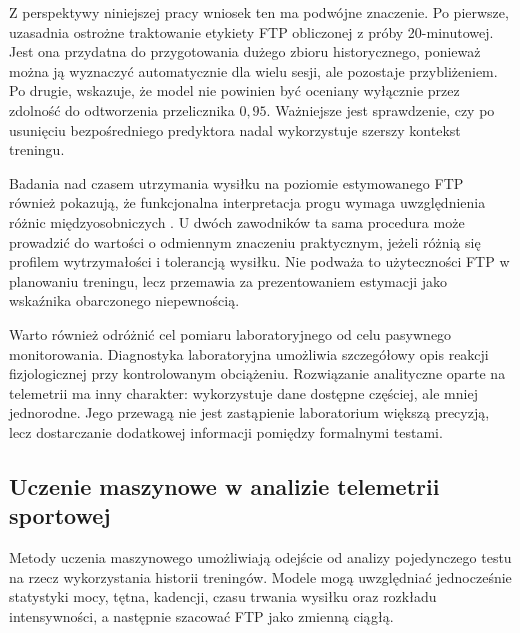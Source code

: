 Z perspektywy niniejszej pracy wniosek ten ma podwójne znaczenie. Po pierwsze, uzasadnia ostrożne traktowanie etykiety FTP obliczonej z próby 20-minutowej. Jest ona przydatna do przygotowania dużego zbioru historycznego, ponieważ można ją wyznaczyć automatycznie dla wielu sesji, ale pozostaje przybliżeniem. Po drugie, wskazuje, że model nie powinien być oceniany wyłącznie przez zdolność do odtworzenia przelicznika $0{,}95$. Ważniejsze jest sprawdzenie, czy po usunięciu bezpośredniego predyktora nadal wykorzystuje szerszy kontekst treningu.

Badania nad czasem utrzymania wysiłku na poziomie estymowanego FTP również pokazują, że funkcjonalna interpretacja progu wymaga uwzględnienia różnic międzyosobniczych \parencite{sitko2022tte}. U dwóch zawodników ta sama procedura może prowadzić do wartości o odmiennym znaczeniu praktycznym, jeżeli różnią się profilem wytrzymałości i tolerancją wysiłku. Nie podważa to użyteczności FTP w planowaniu treningu, lecz przemawia za prezentowaniem estymacji jako wskaźnika obarczonego niepewnością.

Warto również odróżnić cel pomiaru laboratoryjnego od celu pasywnego monitorowania. Diagnostyka laboratoryjna umożliwia szczegółowy opis reakcji fizjologicznej przy kontrolowanym obciążeniu. Rozwiązanie analityczne oparte na telemetrii ma inny charakter: wykorzystuje dane dostępne częściej, ale mniej jednorodne. Jego przewagą nie jest zastąpienie laboratorium większą precyzją, lecz dostarczanie dodatkowej informacji pomiędzy formalnymi testami.

\subsection{Uczenie maszynowe w analizie telemetrii sportowej}

Metody uczenia maszynowego umożliwiają odejście od analizy pojedynczego testu na rzecz wykorzystania historii treningów. Modele mogą uwzględniać jednocześnie statystyki mocy, tętna, kadencji, czasu trwania wysiłku oraz rozkładu intensywności, a następnie szacować FTP jako zmienną ciągłą.

